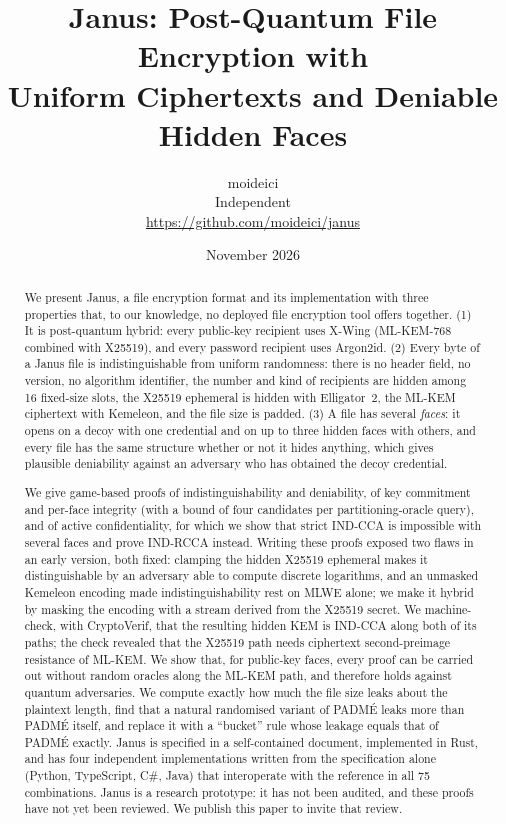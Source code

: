 \documentclass[11pt,a4paper]{article}
\title{Janus: Post-Quantum File Encryption with\\ Uniform Ciphertexts and Deniable Hidden Faces}
\author{moideici\\ \small Independent \\ \small \url{https://github.com/moideici/janus}}
\date{November 2026}
\theoremstyle{definition}
\theoremstyle{remark}
\begin{document}
\maketitle

\begin{abstract}
We present Janus, a file encryption format and its implementation with three properties that, to our knowledge, no deployed file encryption tool offers together.
(1) It is post-quantum hybrid: every public-key recipient uses X-Wing (ML-KEM-768 combined with X25519), and every password recipient uses Argon2id.
(2) Every byte of a Janus file is indistinguishable from uniform randomness: there is no header field, no version, no algorithm identifier, the number and kind of recipients are hidden among 16 fixed-size slots, the X25519 ephemeral is hidden with Elligator~2, the ML-KEM ciphertext with Kemeleon, and the file size is padded.
(3) A file has several \emph{faces}: it opens on a decoy with one credential and on up to three hidden faces with others, and every file has the same structure whether or not it hides anything, which gives plausible deniability against an adversary who has obtained the decoy credential.

We give game-based proofs of indistinguishability and deniability, of key commitment and per-face integrity (with a bound of four candidates per partitioning-oracle query), and of active confidentiality, for which we show that strict IND-CCA is impossible with several faces and prove IND-RCCA instead.
Writing these proofs exposed two flaws in an early version, both fixed: clamping the hidden X25519 ephemeral makes it distinguishable by an adversary able to compute discrete logarithms, and an unmasked Kemeleon encoding made indistinguishability rest on MLWE alone; we make it hybrid by masking the encoding with a stream derived from the X25519 secret.
We machine-check, with CryptoVerif, that the resulting hidden KEM is IND-CCA along both of its paths; the check revealed that the X25519 path needs ciphertext second-preimage resistance of ML-KEM.
We show that, for public-key faces, every proof can be carried out without random oracles along the ML-KEM path, and therefore holds against quantum adversaries.
We compute exactly how much the file size leaks about the plaintext length, find that a natural randomised variant of PADM\'E leaks more than PADM\'E itself, and replace it with a ``bucket'' rule whose leakage equals that of PADM\'E exactly.
Janus is specified in a self-contained document, implemented in Rust, and has four independent implementations written from the specification alone (Python, TypeScript, C\#, Java) that interoperate with the reference in all 75 combinations.
Janus is a research prototype: it has not been audited, and these proofs have not yet been reviewed. We publish this paper to invite that review.
\end{abstract}
\end{document}
